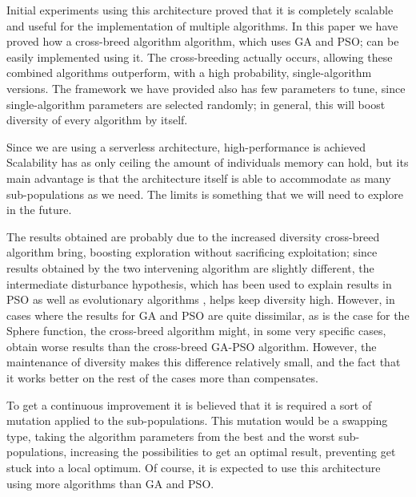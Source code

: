 \documentclass[runningheads]{llncs}
\begin{document}
Initial experiments using this architecture proved that it is completely scalable and useful for the implementation of
multiple algorithms. %
In this paper we have proved how a cross-breed algorithm algorithm,
which uses GA and PSO; can be easily implemented using it. The
cross-breeding actually occurs, allowing these combined algorithms
outperform, with a high probability, single-algorithm
versions. The framework we have provided also has few parameters to
tune, since single-algorithm parameters are selected randomly; in
general, this will boost diversity of every algorithm by itself. 

Since we are using a serverless architecture, high-performance is
achieved %
Scalability has as only ceiling the amount of individuals memory can
hold, but its main advantage is that the architecture itself is able
to accommodate as many sub-populations as we need. The limits is
something that we will need to explore in the future. 

The results obtained are probably due to the increased diversity
cross-breed algorithm bring, boosting exploration without sacrificing
exploitation; since results obtained by 
the two intervening algorithm are slightly different, the intermediate
disturbance hypothesis, which has been used to explain results in PSO
\cite{gao2013particle} as well as evolutionary algorithms
\cite{merelo2008testing},  helps keep diversity high. However, in
cases 
where the results for GA and PSO are quite dissimilar, as is the case
for the Sphere function, the cross-breed algorithm might, in some very
specific cases, obtain worse results than the cross-breed  GA-PSO
algorithm. However, the maintenance of diversity makes this difference
relatively small, and the fact that it works better on the rest of the
cases more than compensates.




To get a continuous improvement it is believed that it is required a sort of
mutation applied to the sub-populations. This mutation would be a swapping type,
taking the algorithm parameters from the best and the worst sub-populations,
increasing the possibilities to get an optimal result, preventing get stuck into
a local optimum. Of course, it is expected to use this architecture using more
algorithms than GA and PSO.
\end{document}
